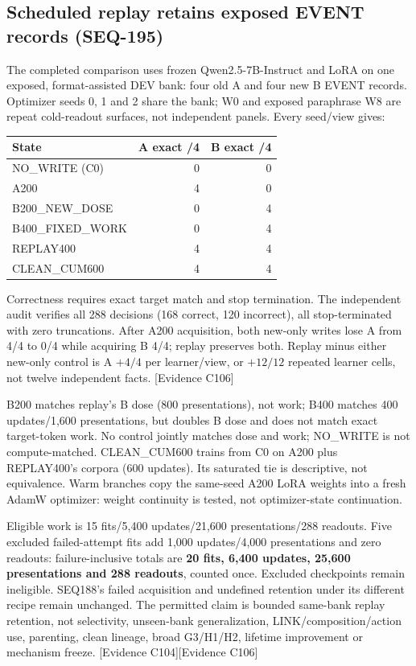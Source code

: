 \documentclass[11pt]{article}
\newcommand{\ev}[1]{\textsf{[Evidence #1]}}
\begin{document}
\subsection{Scheduled replay retains exposed EVENT records (SEQ-195)}
\label{sec:seq195}
The completed comparison uses frozen Qwen2.5-7B-Instruct and LoRA on one
exposed, format-assisted DEV bank: four old A and four new B EVENT records.
Optimizer seeds 0, 1 and 2 share the bank; W0 and exposed paraphrase W8 are
repeat cold-readout surfaces, not independent panels. Every seed/view gives:
\begin{center}
\begin{tabular}{lrr}
\toprule
State & A exact /4 & B exact /4 \\
\midrule
NO\_WRITE (C0) & 0 & 0 \\
A200 & 4 & 0 \\
B200\_NEW\_DOSE & 0 & 4 \\
B400\_FIXED\_WORK & 0 & 4 \\
REPLAY400 & 4 & 4 \\
CLEAN\_CUM600 & 4 & 4 \\
\bottomrule
\end{tabular}
\end{center}
Correctness requires exact target match and stop termination. The independent
audit verifies all 288 decisions (168 correct, 120 incorrect), all
stop-terminated with zero truncations. After A200 acquisition, both new-only
writes lose A from 4/4 to 0/4 while acquiring B 4/4; replay preserves both.
Replay minus either new-only control is A $+4/4$ per learner/view, or
$+12/12$ repeated learner cells, not twelve independent facts. \ev{C106}

B200 matches replay's B dose (800 presentations), not work; B400 matches
400 updates/1,600 presentations, but doubles B dose and does not match exact
target-token work. No control jointly matches dose and work; NO\_WRITE is
not compute-matched. CLEAN\_CUM600 trains from C0 on A200 plus REPLAY400's
corpora (600 updates). Its saturated tie is descriptive, not equivalence.
Warm branches copy the same-seed A200 LoRA weights into a fresh AdamW
optimizer: weight continuity is tested, not optimizer-state continuation.

Eligible work is 15 fits/5,400 updates/21,600 presentations/288 readouts.
Five excluded failed-attempt fits add 1,000 updates/4,000 presentations and
zero readouts: failure-inclusive totals are \textbf{20 fits, 6,400 updates,
25,600 presentations and 288 readouts}, counted once. Excluded checkpoints
remain ineligible. SEQ188's failed acquisition and undefined retention under
its different recipe remain unchanged. The permitted claim is bounded
same-bank replay retention, not selectivity, unseen-bank generalization,
LINK/composition/action use, parenting, clean lineage, broad G3/H1/H2,
lifetime improvement or mechanism freeze. \ev{C104}\ev{C106}
\end{document}
